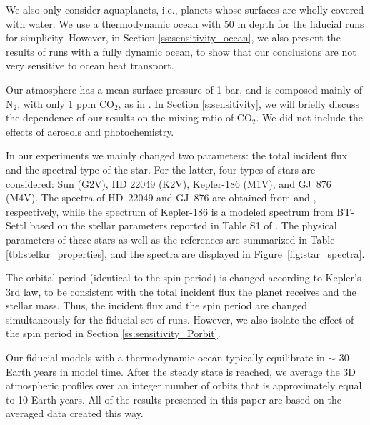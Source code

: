 \documentclass[11pt,numberedappendix,twocolappendix,]{emulateapj}
\begin{document}
We also only consider aquaplanets, i.e., planets whose surfaces are wholly covered with water. 
We use a thermodynamic ocean with 50 m depth for the fiducial runs for simplicity. 
However, in Section \ref{ss:sensitivity_ocean}, we also present the results of runs with a fully dynamic ocean, to show that our conclusions are not very sensitive to ocean heat transport. 

Our atmosphere has a mean surface pressure of 1 bar, and is composed mainly of N$_2$, with only 1 ppm CO$_2$, as in \citet{Kopparapu2016}. 
In Section \ref{s:sensitivity}, we will briefly discuss the dependence of our results on the mixing ratio of CO$_2$. 
We did not include the effects of aerosols and photochemistry. 

In our experiments we mainly changed two parameters: the total incident flux and the spectral type of the star. 
For the latter, four types of stars are considered: 
Sun (G2V), 
HD 22049 (K2V), 
Kepler-186 (M1V), and 
GJ~876 (M4V). 
The spectra of HD~22049 and GJ~876 are obtained from \citet{Segura2003} and \citet{Domagal-Goldman2014}, respectively, 
while the spectrum of Kepler-186 is a modeled spectrum from BT-Settl \citep{Allard2012} based on the stellar parameters reported in Table S1 of \citet{Quintana2014}. 
The physical parameters of these stars as well as the references are summarized in Table \ref{tbl:stellar_properties}, and the spectra are displayed in Figure~\ref{fig:star_spectra}. 

The orbital period (identical to the spin period) is changed according to Kepler's 3rd law, to be consistent with the total incident flux the planet receives and the stellar mass. Thus, the incident flux and the spin period are changed simultaneously for the fiducial set of runs. 
However, we also isolate the effect of the spin period in Section \ref{ss:sensitivity_Porbit}. 

Our fiducial models with a thermodynamic ocean typically equilibrate in $\sim $ 30 Earth years in model time. 
After the steady state is reached, we average the 3D atmospheric profiles over an integer number of orbits that is approximately equal to 10 Earth years. 
All of the results presented in this paper are based on the averaged data created this way. 
\end{document}
